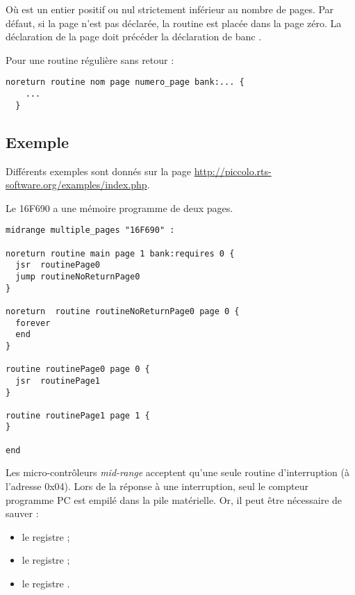 Où  est un entier positif ou nul strictement inférieur au nombre de pages. Par défaut, si la page n'est pas déclarée, la routine est placée dans la page zéro. La déclaration de la page doit précéder la déclaration de banc .

Pour une routine régulière sans retour :
\begin{lstlisting}[language=piccolo]
  noreturn routine nom page numero_page bank:... {
    ...
  }
\end{lstlisting}

\subsection{Exemple}

Différents exemples sont donnés sur la page \url{http://piccolo.rts-software.org/examples/index.php}.

Le 16F690 a une mémoire programme de deux pages. 

\begin{lstlisting}[language=piccolo]
midrange multiple_pages "16F690" :

noreturn routine main page 1 bank:requires 0 {
  jsr  routinePage0
  jump routineNoReturnPage0
}

noreturn  routine routineNoReturnPage0 page 0 {
  forever
  end
}

routine routinePage0 page 0 {
  jsr  routinePage1
}

routine routinePage1 page 1 {
}

end
\end{lstlisting}














Les micro-contrôleurs \emph{mid-range} acceptent qu’une seule routine d’interruption (à l’adresse 0x04). Lors de la réponse à une interruption, seul le compteur programme PC est empilé dans la pile matérielle. Or, il peut être nécessaire de sauver :
\begin{itemize}
  \item le registre  ;
  \item le registre  ;
  \item le registre .
\end{itemize}

